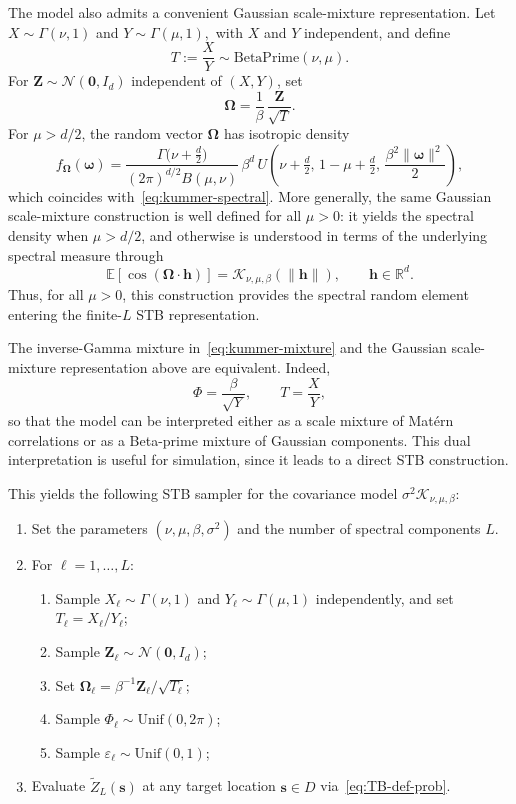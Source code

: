 \documentclass[
  12pt]{article}
\begin{document}
The model also admits a convenient Gaussian scale-mixture representation.
Let
$
X \sim \Gamma(\nu,1)
$
and
$
Y \sim \Gamma(\mu,1),
$
with $X$ and $Y$ independent, and define
\[
T := \frac{X}{Y} \sim \mathrm{BetaPrime}(\nu,\mu).
\]
For $\mathbf{Z}\sim \mathcal{N}(\mathbf{0},I_d)$ independent of $(X,Y)$, set
\[
\boldsymbol{\Omega}
= \frac{1}{\beta}\,\frac{\mathbf{Z}}{\sqrt{T}}.
\]
For $\mu>d/2$, the random vector $\boldsymbol{\Omega}$ has isotropic density
\[
f_{\boldsymbol{\Omega}}(\boldsymbol{\omega})
=
\frac{\Gamma\!\bigl(\nu+\tfrac{d}{2}\bigr)}{(2\pi)^{d/2}B(\mu,\nu)}
\,\beta^{d}\,
U\!\left(\nu+\tfrac{d}{2},\,1-\mu+\tfrac{d}{2},\,\frac{\beta^{2}\|\boldsymbol{\omega}\|^{2}}{2}\right),
\]
which coincides with~\eqref{eq:kummer-spectral}.
More generally, the same Gaussian scale-mixture construction is well defined for all $\mu>0$: it yields the spectral density when $\mu>d/2$, and otherwise is understood in terms of the underlying spectral measure through
\begin{equation}\label{eq:kummer-cosine}
\mathbb{E}\!\left[\cos(\boldsymbol{\Omega}\cdot\mathbf{h})\right]
=
\mathcal{K}_{\nu,\mu,\beta}(\|\mathbf{h}\|),
\qquad \mathbf{h}\in\mathbb{R}^d.
\end{equation}
Thus, for all $\mu>0$, this construction provides the spectral random element entering the finite-$L$ STB representation.

The inverse-Gamma mixture in~\eqref{eq:kummer-mixture} and the Gaussian scale-mixture representation above are equivalent.
Indeed,
\[
\Phi = \frac{\beta}{\sqrt{Y}},
\qquad
T = \frac{X}{Y},
\]
so that the model can be interpreted either as a scale mixture of Mat\'ern correlations or as a Beta-prime mixture of Gaussian components.
This dual interpretation is useful for simulation, since it leads to a direct STB construction.

This yields the following STB sampler for the covariance model $\sigma^2\mathcal{K}_{\nu,\mu,\beta}$:
\begin{enumerate}
\item Set the parameters $(\nu,\mu,\beta,\sigma^2)$ and the number of spectral components $L$.
\item For $\ell=1,\dots,L$:
\begin{enumerate}
\item Sample $X_\ell \sim \Gamma(\nu,1)$ and $Y_\ell \sim \Gamma(\mu,1)$ independently, and set $T_\ell = X_\ell / Y_\ell$;
\item Sample $\mathbf{Z}_\ell \sim \mathcal{N}(\mathbf{0},I_d)$;
\item Set $\boldsymbol{\Omega}_\ell = \beta^{-1}\mathbf{Z}_\ell / \sqrt{T_\ell}$;
\item Sample $\Phi_\ell \sim \mathrm{Unif}(0,2\pi)$;
\item Sample $\varepsilon_\ell\sim\mathrm{Unif}(0,1)$;
\end{enumerate}
\item Evaluate $\widetilde Z_L(\mathbf{s})$ at any target location $\mathbf{s}\in D$ via~\eqref{eq:TB-def-prob}.
\end{enumerate}
\end{document}
